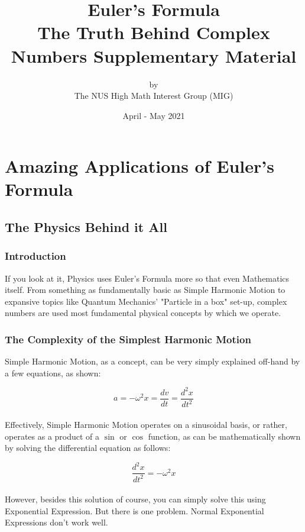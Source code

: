 \documentclass[a4paper,12pt,oneside]{book}
\title{%
  \Huge Euler's Formula \\
  \LARGE  The Truth Behind Complex Numbers
  \Large Supplementary Material
  }
\author{by \\
\Large The NUS High Math Interest Group (MIG) \\
}
\date{\Large April - May 2021}
\begin{document}
\maketitle

\tableofcontents

\part{Amazing Applications of Euler's Formula}
\chapter{The Physics Behind it All}
\section{Introduction}
If you look at it, Physics uses Euler's Formula more so that even Mathematics itself. From something as fundamentally basic as Simple Harmonic Motion to expansive topics like Quantum Mechanics' "Particle in a box" set-up, complex numbers are used most fundamental physical concepts by which we operate.

\section{The Complexity of the Simplest Harmonic Motion}
Simple Harmonic Motion, as a concept, can be very simply explained off-hand by a few equations, as shown:

\[a = -\omega^2 x = \frac{dv}{dt} = \frac{d^2x}{dt^2} \] \\

Effectively, Simple Harmonic Motion operates on a sinusoidal basis, or rather, operates as a product of a $\sin$ or $\cos$ function, as can be mathematically shown by solving the differential equation as follows:

\[\frac{d^2x}{dt^2} = -\omega^2 x \] \\

However, besides this solution of course, you can simply solve this using Exponential Expression. But there is one problem. Normal Exponential Expressions don't work well.
\end{document}
